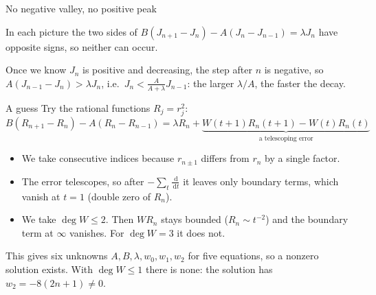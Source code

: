 \documentclass[aspectratio=169,11pt]{beamer}
\newcommand{\dd}{\,\mathrm{d}}
\begin{document}
\begin{frame}{No negative valley, no positive peak}
  \centering
  \medskip

  \raggedright
  In each picture the two sides of $B(J_{n+1}-J_n)-A(J_n-J_{n-1})=\lambda J_n$ have opposite
  signs, so neither can occur.
  \pause

  Once we know $J_n$ is positive and decreasing, the step after $n$ is negative, so
  $A(J_{n-1}-J_n)>\lambda J_n$, i.e.\ $J_n<\frac{A}{A+\lambda}J_{n-1}$: the larger $\lambda/A$,
  the faster the decay.
\end{frame}

\begin{frame}{A guess}
  Try the rational functions $R_j=r_j^2$:
  \[
    B(R_{n+1}-R_n)-A(R_n-R_{n-1})=\lambda R_n+\underbrace{W(t+1)R_n(t+1)-W(t)R_n(t)}_{\text{a telescoping error}}
  \]
  \pause
  \begin{itemize}
    \item We take consecutive indices because $r_{n\pm1}$ differs from $r_n$ by a single factor.
    \item The error telescopes, so after $-\sum_t\frac{\dd}{\dd t}$ it leaves only boundary terms,
      which vanish at $t=1$ (double zero of $R_n$).
    \item We take $\deg W\le2$. Then $WR_n$ stays bounded ($R_n\sim t^{-2}$) and the boundary term
      at $\infty$ vanishes. For $\deg W=3$ it does not.
  \end{itemize}
  \pause
  This gives six unknowns $A,B,\lambda,w_0,w_1,w_2$ for five equations, so a nonzero solution
  exists. With $\deg W\le1$ there is none: the solution has $w_2=-8(2n+1)\ne0$.
\end{frame}
\end{document}
